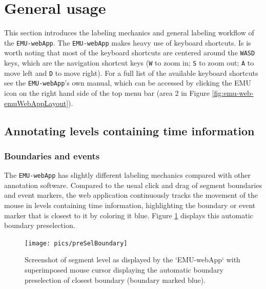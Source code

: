 \documentclass[]{book}
\begin{document}
\hypertarget{sec:webApp-generalUsage}{%
\section{General usage}\label{sec:webApp-generalUsage}}

This section introduces the labeling mechanics and general labeling workflow of the \texttt{EMU-webApp}. The \texttt{EMU-webApp} makes heavy use of keyboard shortcuts. Is is worth noting that most of the keyboard shortcuts are centered around the \texttt{WASD} keys, which are the navigation shortcut keys (\texttt{W} to zoom in; \texttt{S} to zoom out; \texttt{A} to move left and \texttt{D} to move right). For a full list of the available keyboard shortcuts see the \texttt{EMU-webApp}'s own manual, which can be accessed by clicking the EMU icon on the right hand side of the top menu bar (area 2 in Figure \ref{fig:emu-web-emuWebAppLayout}).

\hypertarget{annotating-levels-containing-time-information}{%
\subsection{Annotating levels containing time information}\label{annotating-levels-containing-time-information}}

\hypertarget{boundaries-and-events}{%
\subsubsection*{Boundaries and events}\label{boundaries-and-events}}

The \texttt{EMU-webApp} has slightly different labeling mechanics compared with other annotation software. Compared to the usual click and drag of segment boundaries and event markers, the web application continuously tracks the movement of the mouse in levels containing time information, highlighting the boundary or event marker that is closest to it by coloring it blue. Figure \ref{fig:webApp-preSelBoundary} displays this automatic boundary preselection.

\begin{figure}

{\centering \texttt{[image: pics/preSelBoundary]} 

}

\caption{Screenshot of segment level as displayed by the `EMU-webApp` with superimposed mouse cursor displaying the automatic boundary preselection of closest boundary (boundary marked blue).}\label{fig:webApp-preSelBoundary}
\end{figure}
\end{document}
